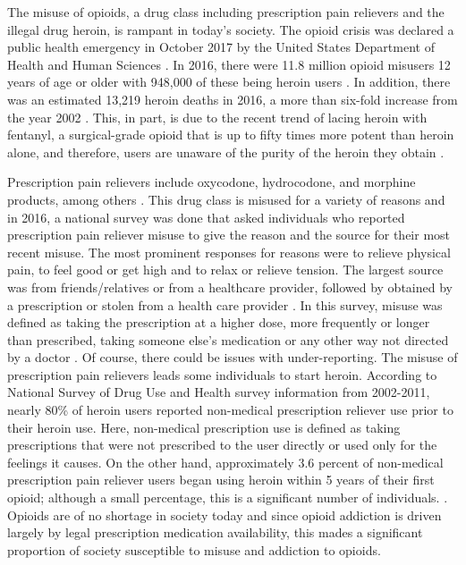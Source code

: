 \documentclass[12pt]{article}
\begin{document}
The misuse of opioids, a drug class including prescription pain relievers and the illegal drug heroin, is rampant in today's society. The opioid crisis was declared a public health emergency in October 2017 by the United States Department of Health and Human Sciences \cite{HHS1}. In 2016, there were 11.8 million opioid misusers 12 years of age or older with 948,000 of these being heroin users \cite{CDC2}. In addition, there was an estimated 13,219 heroin deaths in 2016, a more than six-fold increase from the year 2002 \cite{NSDUH1}. This, in part, is due to the recent trend of lacing heroin with fentanyl, a surgical-grade opioid that is up to fifty times more potent than heroin alone, and therefore, users are unaware of the purity of the heroin they obtain \cite{CDC1, Volkow2}.

Prescription pain relievers include oxycodone, hydrocodone, and morphine products, among others \cite{CDC3}. This drug class is misused for a variety of reasons and in 2016, a national survey was done that asked individuals who reported prescription pain reliever misuse to give the reason and the source for their most recent misuse. The most prominent responses for reasons were to relieve physical pain, to feel good or get high and to relax or relieve tension. The largest source was from friends/relatives or from a healthcare provider, followed by obtained by a prescription or stolen from a health care provider \cite{CDC2}. In this survey, misuse was defined as taking the prescription at a higher dose, more frequently or longer than prescribed, taking someone else's medication or any other way not directed by a doctor \cite{SAMSHA3}. Of course, there could be issues with under-reporting. The misuse of prescription pain relievers leads some individuals to start heroin.  According to National Survey of Drug Use and Health survey information from 2002-2011, nearly 80\% of heroin users reported non-medical prescription reliever use prior to their heroin use. Here, non-medical prescription use is defined as taking prescriptions that were not prescribed to the user directly or used only for the feelings it causes. On the other hand, approximately 3.6 percent of non-medical prescription pain reliever users began using heroin within 5 years of their first opioid; although a small percentage, this is a significant number of individuals. \cite{Muhuri}.  Opioids are of no shortage in society today and since opioid addiction is driven largely by legal prescription medication availability, this mades a significant proportion of society susceptible to misuse and addiction to opioids. 
\end{document}
